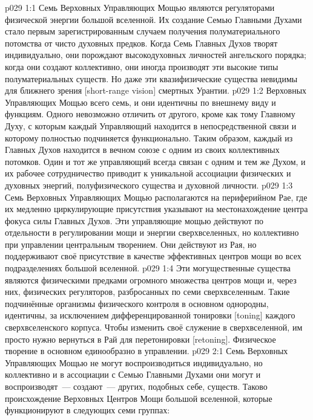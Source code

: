 \vs p029 1:1 Семь Верховных Управляющих Мощью являются регуляторами физической энергии большой вселенной. Их создание Семью Главными Духами стало первым зарегистрированным случаем получения полуматериального потомства от чисто духовных предков. Когда Семь Главных Духов творят индивидуально, они порождают высокодуховных личностей ангельского порядка; когда они создают коллективно, они иногда производят эти высокие типы полуматериальных существ. Но даже эти квазифизические существа невидимы для ближнего зрения [short\hyp{}range vision] смертных Урантии.
\vs p029 1:2 Верховных Управляющих Мощью всего семь, и они идентичны по внешнему виду и функциям. Одного невозможно отличить от другого, кроме как тому Главному Духу, с которым каждый Управляющий находится в непосредственной связи и которому полностью подчиняется функционально. Таким образом, каждый из Главных Духов находится в вечном союзе с одним из своих коллективных потомков. Один и тот же управляющий всегда связан с одним и тем же Духом, и их рабочее сотрудничество приводит к уникальной ассоциации физических и духовных энергий, полуфизического существа и духовной личности.
\vs p029 1:3 Семь Верховных Управляющих Мощью располагаются на периферийном Рае, где их медленно циркулирующие присутствия указывают на местонахождение центра фокуса силы Главных Духов. Эти управляющие мощью действуют по отдельности в регулировании мощи и энергии сверхвселенных, но коллективно при управлении центральным творением. Они действуют из Рая, но поддерживают своё присутствие в качестве эффективных центров мощи во всех подразделениях большой вселенной.
\vs p029 1:4 Эти могущественные существа являются физическими предками огромного множества центров мощи и, через них, физических регуляторов, разбросанных по семи сверхвселенным. Такие подчинённые организмы физического контроля в основном однородны, идентичны, за исключением дифференцированной тонировки [toning] каждого сверхвселенского корпуса. Чтобы изменить своё служение в сверхвселенной, им просто нужно вернуться в Рай для перетонировки [retoning]. Физическое творение в основном единообразно в управлении.
\vs p029 2:1 Семь Верховных Управляющих Мощью не могут воспроизводиться индивидуально, но коллективно и в ассоциации с Семью Главными Духами они могут и воспроизводят~--- создают~--- других, подобных себе, существ. Таково происхождение Верховных Центров Мощи большой вселенной, которые функционируют в следующих семи группах:
